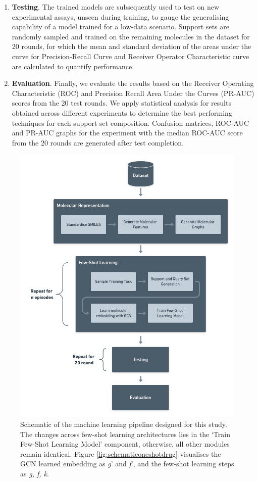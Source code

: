 \begin{enumerate}
	\item \textbf{Testing}. The trained models are subsequently used to test on new experimental assays, unseen during training, to gauge the generalising capability of a model trained for a low-data scenario. Support sets are randomly sampled and trained on the remaining molecules in the dataset for 20 rounds, for which the mean and standard deviation of the areas under the curve for Precision-Recall Curve and Receiver Operator Characteristic curve are calculated to quantify performance.

	\item \textbf{Evaluation}. Finally, we evaluate the results based on the Receiver Operating Characteristic (ROC) and Precision Recall Area Under the Curves (PR-AUC) scores from the 20 test rounds. We apply statistical analysis for results obtained across different experiments to determine the best performing techniques for each support set composition. Confusion matrices, ROC-AUC and PR-AUC graphs for the experiment with the median ROC-AUC score from the 20 rounds are generated after test completion.
\end{enumerate}

\begin{figure}[!ht]
	\centering
	\includegraphics[width=0.9\linewidth]{img/architecture-schematic.png}
	\caption[Schematic of the major parts in our architecture]{Schematic of the machine learning pipeline designed for this study. The changes across few-shot learning architectures lies in the `Train Few-Shot Learning Model' component, otherwise, all other modules remain identical. Figure \ref{fig:schematiconeshotdrug} visualises the GCN learned embedding as \textit{g}' and \textit{f}', and the few-shot learning steps as \textit{g, f, k}.}
	\label{fig:architecture-schematic}
\end{figure}

